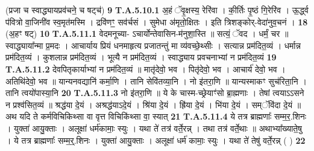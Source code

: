 \documentclass[17pt]{extarticle}
\begin{document}
                  \newline
                                                        (प्रजा च स्वाद्ध्यायप्रव॑चने॒ च षट्च॑) \textbf{9} \newline \newline
                                \textbf{ T.A.5.10.1} \newline
                  अ॒हं ॅवृ॒क्षस्य॒ रेरि॑वा ।  की॒र्तिः पृ॒ष्ठं गि॒रेरि॑व ।  ऊ॒र्द्ध्व प॑वित्रो वा॒जिनी॑व स्व॒मृत॑मस्मि । द्रवि॑णꣳ॒॒ सव॑र्चसं । सुमेधा अ॑मृतो॒क्षितः । इति त्रिशङ्कोर्-वेदा॑नुव॒चनं । \textbf{ 18} \newline
                  \newline
                                                        (अ॒हꣳ षट्) \textbf{10} \newline \newline
                                \textbf{ T.A.5.11.1} \newline
                  वेदमनूच्या- ऽचार्योन्तेवासिन-म॑नुशा॒स्ति ॥  सत्यं॒ ॅवद । धर्मं॒ चर ॥ स्वाद्ध्याया᳚न्मा प्र॒मदः । आचार्याय प्रियं धनमाहृत्य प्रजातन्तुं मा व्य॑वच्छे॒थ्सीः । सत्यान्न प्रम॑दित॒व्यं । धर्मान्न प्रम॑दित॒व्यं । कुशलान्न प्रम॑दित॒व्यं ।  भूत्यै न प्रम॑दित॒व्यं । स्वाद्ध्याय प्रवचनाभ्यां न प्रम॑दित॒व्यं \textbf{ 19} \newline
                  \newline
                                                                  \textbf{ T.A.5.11.2} \newline
                  देवपितृकार्याभ्यां न प्रम॑दित॒व्यं ॥  मातृ॑देवो॒ भव । पितृ॑देवो॒ भव ।  आचार्य॑ देवो॒ भव । अतिथि॑देवो॒ भव ॥  यान्यनवद्यानि॑ कर्मा॒णि । तानि सेवि॑तव्या॒नि ।  नो इ॑तरा॒णि ॥ यान्यस्माकꣳ सुच॑रिता॒नि । तानि त्वयो॑पास्या॒नि \textbf{ 20} \newline
                  \newline
                                                                  \textbf{ T.A.5.11.3} \newline
                  नो इ॑तरा॒णि ॥ ये के चास्म-च्छ्रेयाꣳ॑सो ब्रा॒ह्मणाः । तेषां त्वयाऽऽसने न प्रश्व॑सित॒व्यं ॥ श्रद्ध॑या दे॒यं । अश्रद्ध॑याऽदे॒यं । श्रि॑या दे॒यं । ह्रि॑या दे॒यं । भि॑या दे॒यं । सम्ॅवि॑दा दे॒यं ॥  अथ यदि ते कर्मविचिकिथ्सा वा वृत्त विचिकि॑थ्सा वा॒ स्यात् \textbf{ 21} \newline
                  \newline
                                                                  \textbf{ T.A.5.11.4} \newline
                  ये तत्र ब्राह्मणाः᳚ सम्म॒र॒.शिनः । युक्ता॑ आयु॒क्ताः ।  अलूक्षा॑ धर्म॑कामाः॒ स्युः । यथा ते॑ तत्र॑ वर्ते॒रन्न् । तथा तत्र॑ वर्ते॒थाः ॥ अथाभ्या᳚ख्याते॒षु । ये तत्र ब्राह्मणाः᳚ सम्म॒र्॒.शिनः । युक्ता॑ आयु॒क्ताः ।  अलूक्षा॑ धर्म॑ कामाः॒ स्युः । यथा ते॑ तेषु॑ वर्ते॒रन्न् ( ) \textbf{ 22} \newline
\end{document}
